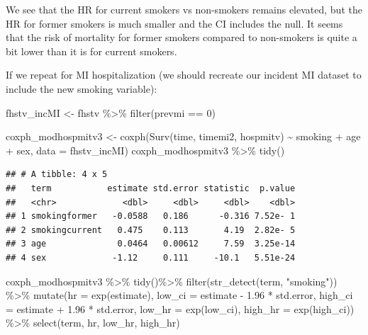 \documentclass[
]{book}
\newenvironment{Shaded}{\begin{snugshade}}{\end{snugshade}}
\newcommand{\AttributeTok}[1]{\textcolor[rgb]{0.77,0.63,0.00}{#1}}
\newcommand{\DecValTok}[1]{\textcolor[rgb]{0.00,0.00,0.81}{#1}}
\newcommand{\FloatTok}[1]{\textcolor[rgb]{0.00,0.00,0.81}{#1}}
\newcommand{\FunctionTok}[1]{\textcolor[rgb]{0.00,0.00,0.00}{#1}}
\newcommand{\NormalTok}[1]{#1}
\newcommand{\OtherTok}[1]{\textcolor[rgb]{0.56,0.35,0.01}{#1}}
\newcommand{\SpecialCharTok}[1]{\textcolor[rgb]{0.00,0.00,0.00}{#1}}
\newcommand{\StringTok}[1]{\textcolor[rgb]{0.31,0.60,0.02}{#1}}
\begin{document}
We see that the HR for current smokers vs non-smokers remains elevated, but the HR for former smokers is much smaller and the CI includes the null. It seems that the risk of mortality for former smokers compared to non-smokers is quite a bit lower than it is for current smokers.

If we repeat for MI hospitalization (we should recreate our incident MI dataset to include the new smoking variable):

\begin{Shaded}
\begin{Highlighting}[]
\NormalTok{fhstv\_incMI }\OtherTok{\textless{}{-}}\NormalTok{ fhstv }\SpecialCharTok{\%\textgreater{}\%}
  \FunctionTok{filter}\NormalTok{(prevmi }\SpecialCharTok{==} \DecValTok{0}\NormalTok{) }

\NormalTok{coxph\_modhospmitv3 }\OtherTok{\textless{}{-}} \FunctionTok{coxph}\NormalTok{(}\FunctionTok{Surv}\NormalTok{(time, timemi2, hospmitv) }\SpecialCharTok{\textasciitilde{}} 
\NormalTok{                              smoking }\SpecialCharTok{+}\NormalTok{ age }\SpecialCharTok{+}\NormalTok{ sex, }
                            \AttributeTok{data =}\NormalTok{ fhstv\_incMI)}
\NormalTok{coxph\_modhospmitv3 }\SpecialCharTok{\%\textgreater{}\%}
  \FunctionTok{tidy}\NormalTok{()}
\end{Highlighting}
\end{Shaded}

\begin{verbatim}
## # A tibble: 4 x 5
##   term           estimate std.error statistic  p.value
##   <chr>             <dbl>     <dbl>     <dbl>    <dbl>
## 1 smokingformer   -0.0588   0.186      -0.316 7.52e- 1
## 2 smokingcurrent   0.475    0.113       4.19  2.82e- 5
## 3 age              0.0464   0.00612     7.59  3.25e-14
## 4 sex             -1.12     0.111     -10.1   5.51e-24
\end{verbatim}

\begin{Shaded}
\begin{Highlighting}[]
\NormalTok{coxph\_modhospmitv3 }\SpecialCharTok{\%\textgreater{}\%} 
  \FunctionTok{tidy}\NormalTok{()}\SpecialCharTok{\%\textgreater{}\%} 
  \FunctionTok{filter}\NormalTok{(}\FunctionTok{str\_detect}\NormalTok{(term, }\StringTok{"smoking"}\NormalTok{)) }\SpecialCharTok{\%\textgreater{}\%}
  \FunctionTok{mutate}\NormalTok{(}\AttributeTok{hr =} \FunctionTok{exp}\NormalTok{(estimate),}
         \AttributeTok{low\_ci =}\NormalTok{ estimate }\SpecialCharTok{{-}} \FloatTok{1.96} \SpecialCharTok{*}\NormalTok{ std.error, }
         \AttributeTok{high\_ci =}\NormalTok{ estimate }\SpecialCharTok{+} \FloatTok{1.96} \SpecialCharTok{*}\NormalTok{ std.error, }
         \AttributeTok{low\_hr =} \FunctionTok{exp}\NormalTok{(low\_ci), }
         \AttributeTok{high\_hr =} \FunctionTok{exp}\NormalTok{(high\_ci)) }\SpecialCharTok{\%\textgreater{}\%} 
  \FunctionTok{select}\NormalTok{(term, hr, low\_hr, high\_hr)}
\end{Highlighting}
\end{Shaded}
\end{document}
